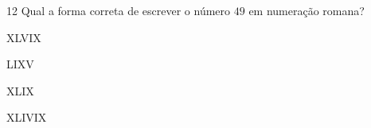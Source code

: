 

\num{12} Qual a forma correta de escrever o número $49$ em numeração romana?

\begin{escolha}
\item XLVIX
\item LIXV
\item XLIX
\item XLIVIX
\end{escolha}



